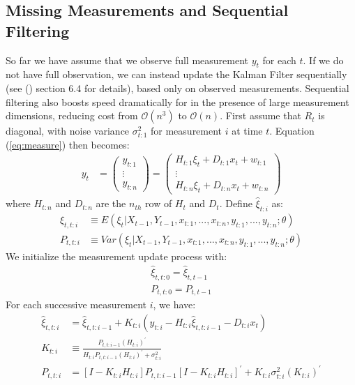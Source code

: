 \documentclass[12pt]{article}
\numberwithin{equation}{section}
\begin{document}
\subsection{Missing Measurements and Sequential Filtering} \label{subsec:seq_filter}
So far we have assume that we observe full measurement $y_t$ for each $t$. If we do not have full observation, we can instead update the Kalman Filter sequentially (see (\cite{durbin_koopman_2001}) section 6.4 for details), based only on observed measurements. Sequential filtering also boosts speed dramatically for in the presence of large measurement dimensions, reducing cost from $\mathcal{O}(n^3)$ to $\mathcal{O}(n)$. First assume that $R_t$ is diagonal, with noise variance $\sigma_{t:1}^2$ for measurement $i$ at time $t$. Equation (\ref{eq:measure}) then becomes:
\begin{align*}
    y_t &= 
    \begin{pmatrix}
        y_{t:1} \\
        \vdots \\ 
        y_{t:n}
    \end{pmatrix} 
    = \begin{pmatrix}
        H_{t:1}\xi_t + D_{t:1}x_t + w_{t:1} \\
        \vdots \\
        H_{t:n}\xi_t + D_{t:n}x_t + w_{t:n}
    \end{pmatrix}
\end{align*}
where $H_{t:n}$ and $D_{t:n}$ are the $n_{th}$ row of $H_t$ and $D_t$. Define $\hat{\xi}_{t:i}$ as:
\begin{align*}
    \hat{\xi}_{t,t:i} &\equiv E(\xi_t|X_{t-1},Y_{t-1},x_{t:1},...,x_{t:n},y_{t:1},...,y_{t:n};\theta) \\
    P_{t,t:i} &\equiv Var(\xi_t|X_{t-1},Y_{t-1},x_{t:1},...,x_{t:n},y_{t:1},...,y_{t:n};\theta) 
\end{align*}
We initialize the measurement update process with:
\begin{align}
    \hat{\xi}_{t,t:0} = \hat{\xi}_{t,t-1} \label{eq:seq_init1} \\
    P_{t,t:0} = P_{t,t-1} \label{eq:seq_init2}
\end{align}
For each successive measurement $i$, we have:
\begin{align}
    \hat{\xi}_{t,t:i} &= \hat{\xi}_{t,t:i-1} + K_{t:i}(y_{t:i} - H_{t:i}\hat{\xi}_{t,t:i-1} - D_{t:i}x_{t}) \label{eq:seq_start} \\ 
    K_{t:i} &\equiv \frac{P_{t,t:i-1}(H_{t:i})^{'}}{H_{t:i}P_{t,t:i-1}(H_{t:i})^{'}+\sigma_{t:i}^{2}} \\
    P_{t,t:i} &= [I - K_{t:i}H_{t:i}]P_{t,t:i-1}[I-K_{t:i}H_{t:i}]^{'} + K_{t:i}\sigma_{t:i}^{2}(K_{t:i})^{'} \label{eq:seq_end}
\end{align}
\end{document}

